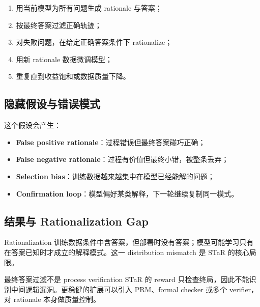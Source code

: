 \documentclass[a4paper]{article}
\begin{document}
\begin{enumerate}
    \item 用当前模型为所有问题生成 rationale 与答案；
    \item 按最终答案过滤正确轨迹；
    \item 对失败问题，在给定正确答案条件下 rationalize；
    \item 用新 rationale 数据微调模型；
    \item 重复直到收益饱和或数据质量下降。
\end{enumerate}

\subsection{隐藏假设与错误模式}


这个假设会产生：

\begin{itemize}
    \item \textbf{False positive rationale}：过程错误但最终答案碰巧正确；
    \item \textbf{False negative rationale}：过程有价值但最终小错，被整条丢弃；
    \item \textbf{Selection bias}：训练数据越来越集中在模型已经能解的问题；
    \item \textbf{Confirmation loop}：模型偏好某类解释，下一轮继续复制同一模式。
\end{itemize}

\subsection{结果与 Rationalization Gap}



Rationalization 训练数据条件中含答案，但部署时没有答案；模型可能学习只有在答案已知时才成立的解释模式。这一 distribution mismatch 是 STaR 的核心局限。

\begin{warningbox}{最终答案过滤不是 process verification}
STaR 的 reward 只检查终局，因此不能识别中间逻辑漏洞。更稳健的扩展可以引入 PRM、formal checker 或多个 verifier，对 rationale 本身做质量控制。
\end{warningbox}
\end{document}

